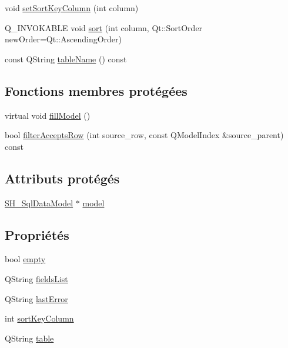 \begin{DoxyCompactItemize}
\item 
void \hyperlink{classSimpleHotel_1_1SH__ExtendedProxyModel_a901f2d931216126e6769482d91f02fa0}{set\-Sort\-Key\-Column} (int column)
\item 
Q\-\_\-\-I\-N\-V\-O\-K\-A\-B\-L\-E void \hyperlink{classSimpleHotel_1_1SH__ExtendedProxyModel_a5d7686a9fae295e0662057b8450c8a8d}{sort} (int column, Qt\-::\-Sort\-Order new\-Order=Qt\-::\-Ascending\-Order)
\item 
const Q\-String \hyperlink{classSimpleHotel_1_1SH__ExtendedProxyModel_a49617ea8bab745425beec3dbd3fddba7}{table\-Name} () const 
\end{DoxyCompactItemize}
\subsection*{Fonctions membres protégées}
\begin{DoxyCompactItemize}
\item 
virtual void \hyperlink{classSimpleHotel_1_1SH__RoomsTableModel_a9ec537b3278ea96dcf8ef615828f1a91}{fill\-Model} ()
\item 
bool \hyperlink{classSimpleHotel_1_1SH__ExtendedProxyModel_a11b30f0f630fe9ddaa778eb9534918e1}{filter\-Accepts\-Row} (int source\-\_\-row, const Q\-Model\-Index \&source\-\_\-parent) const 
\end{DoxyCompactItemize}
\subsection*{Attributs protégés}
\begin{DoxyCompactItemize}
\item 
\hyperlink{classSimpleHotel_1_1SH__SqlDataModel}{S\-H\-\_\-\-Sql\-Data\-Model} $\ast$ \hyperlink{classSimpleHotel_1_1SH__ExtendedProxyModel_ad31718ed4f13ecafcb53dbf1e392b3b0}{model}
\end{DoxyCompactItemize}
\subsection*{Propriétés}
\begin{DoxyCompactItemize}
\item 
bool \hyperlink{classSimpleHotel_1_1SH__ExtendedProxyModel_a45f47ab859c5443353977e22417de357}{empty}
\item 
Q\-String \hyperlink{classSimpleHotel_1_1SH__ExtendedProxyModel_a8872cff3d50bf25b1673ed2c951eeb4a}{fields\-List}
\item 
Q\-String \hyperlink{classSimpleHotel_1_1SH__ExtendedProxyModel_a8b5c74b23d91bde591eba6d32a20c30f}{last\-Error}
\item 
int \hyperlink{classSimpleHotel_1_1SH__ExtendedProxyModel_a879989e7ae305dc2794b281c5e0ab689}{sort\-Key\-Column}
\item 
Q\-String \hyperlink{classSimpleHotel_1_1SH__ExtendedProxyModel_a98cd3050230163561b4dac11a9675b8e}{table}
\end{DoxyCompactItemize}


